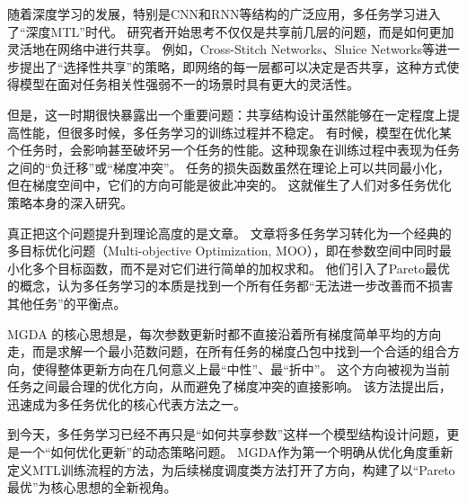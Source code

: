随着深度学习的发展，特别是CNN和RNN等结构的广泛应用，多任务学习进入了“深度MTL”时代。
研究者开始思考不仅仅是共享前几层的问题，而是如何更加灵活地在网络中进行共享。
例如，Cross-Stitch Networks\cite{misra2016cross}、Sluice Networks\cite{ruder2019latent}等进一步提出了“选择性共享”的策略，即网络的每一层都可以决定是否共享，这种方式使得模型在面对任务相关性强弱不一的场景时具有更大的灵活性。

但是，这一时期很快暴露出一个重要问题：共享结构设计虽然能够在一定程度上提高性能，但很多时候，多任务学习的训练过程并不稳定。
有时候，模型在优化某个任务时，会影响甚至破坏另一个任务的性能。这种现象在训练过程中表现为任务之间的“负迁移”或“梯度冲突”。
任务的损失函数虽然在理论上可以共同最小化，但在梯度空间中，它们的方向可能是彼此冲突的。
这就催生了人们对多任务优化策略本身的深入研究。

真正把这个问题提升到理论高度的是文章\cite{desideri2012multiple,sener2018multi}。
文章将多任务学习转化为一个经典的多目标优化问题（Multi-objective Optimization, MOO），即在参数空间中同时最小化多个目标函数，而不是对它们进行简单的加权求和。
他们引入了Pareto最优的概念，认为多任务学习的本质是找到一个所有任务都“无法进一步改善而不损害其他任务”的平衡点。

MGDA 的核心思想是，每次参数更新时都不直接沿着所有梯度简单平均的方向走，而是求解一个最小范数问题，在所有任务的梯度凸包中找到一个合适的组合方向，使得整体更新方向在几何意义上最“中性”、最“折中”。
这个方向被视为当前任务之间最合理的优化方向，从而避免了梯度冲突的直接影响。
该方法提出后，迅速成为多任务优化的核心代表方法之一。

到今天，多任务学习已经不再只是“如何共享参数”这样一个模型结构设计问题，更是一个“如何优化更新”的动态策略问题。
MGDA作为第一个明确从优化角度重新定义MTL训练流程的方法，为后续梯度调度类方法打开了方向，构建了以“Pareto最优”为核心思想的全新视角。

